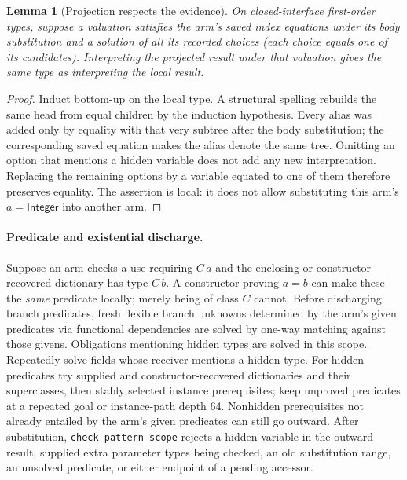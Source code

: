 \documentclass[11pt]{article}
\newtheorem{lemma}[theorem]{Lemma}
\theoremstyle{definition}
\newcommand{\src}[1]{\nolinkurl{#1}}
\newcommand{\Int}{\mathsf{Integer}}
\begin{document}
\begin{lemma}[Projection respects the evidence]\label{lem:project}
On closed-interface first-order types, suppose a valuation satisfies the
arm's saved index equations under its body substitution and a solution of
all its recorded choices (each choice equals one of its candidates).
Interpreting the projected result under that valuation gives the same type
as interpreting the local result.
\end{lemma}
\begin{proof}
Induct bottom-up on the local type. A structural spelling rebuilds the same
head from equal children by the induction hypothesis. Every alias was
added only by equality with that very subtree after the body substitution;
the corresponding saved equation makes the alias denote the same tree.
Omitting an option that mentions a hidden variable does not add any new
interpretation. Replacing the remaining options by a variable equated
to one of them therefore preserves equality. The assertion is local:
it does not allow substituting this arm's $a=\Int$ into another arm.
\end{proof}

\paragraph{Predicate and existential discharge.}
Suppose an arm checks a use requiring $C\,a$ and the enclosing or
constructor-recovered dictionary has type $C\,b$. A constructor proving
$a=b$ can make these the \emph{same} predicate locally; merely being of
class $C$ cannot. Before discharging branch predicates, fresh flexible
branch unknowns determined by the arm's given predicates via functional
dependencies are solved by one-way matching against those givens.
Obligations mentioning hidden types are solved in this scope. Repeatedly
solve fields whose receiver mentions a hidden type. For hidden predicates
try supplied and constructor-recovered dictionaries and their superclasses,
then stably selected instance prerequisites; keep unproved predicates at a
repeated goal or instance-path depth 64. Nonhidden prerequisites not
already entailed by the arm's given predicates can still go outward. After
substitution, \src{check-pattern-scope} rejects a hidden variable in the
outward result, supplied extra parameter types being checked, an old
substitution range, an unsolved predicate, or either endpoint of a pending
accessor.
\end{document}
